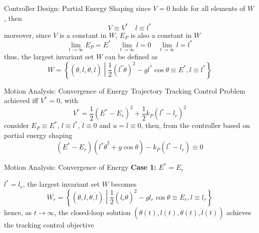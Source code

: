\documentclass[10pt]{beamer}
\begin{document}
  \begin{frame}{Controller Design: Partial Energy Shaping}
    since $\dot{V} = 0$ holds for all elements of $W$, then
    \begin{equation*}
      V \equiv V^* \quad l \equiv l^*
    \end{equation*} 
    moreover,
    since $V$ is a constant in $W$, $E_P$ is also a constant in $W$
    \begin{equation*}
      \lim_{t\rightarrow \infty} E_P = E^* \quad
      \lim_{t\rightarrow \infty} \dot{l} = 0 \quad
      \lim_{t\rightarrow \infty} l = l^*
    \end{equation*}     
    thus, the largest invariant set $W$ can be defined as
    \begin{equation*}
      W = \left\{(\theta,l,\dot{\theta},\dot{l})\middle|
        \frac{1}{2}(l^*\dot{\theta})^2-gl^*\cos\theta \equiv E^*,
        l \equiv l^*\right\}
    \end{equation*}
  \end{frame}

  \begin{frame}{Motion Analysis: Convergence of Energy}
    Trajectory Tracking Control Problem achieved iff $V^*=0$, with
    \begin{equation*}
      V^* = \frac{1}{2}(E^*-E_r)^2+\frac{1}{2}k_P(l^*-l_r)^2
    \end{equation*}
    consider $E_P \equiv E^*$, $l \equiv l^*$, $\dot{l} \equiv 0$
    and $u = \ddot{l} \equiv 0$, then, from the controller
    based on partial energy shaping
    \begin{equation*}
      (E^*-E_r)(l^*\dot{\theta}^2+g\cos\theta)-k_P(l^*-l_r) \equiv 0
    \end{equation*}
  \end{frame}

  \begin{frame}{Motion Analysis: Convergence of Energy}
    \noindent \textbf{Case 1:} $E^* = E_r$

    $l^* = l_r$, the largest invariant set $W$ becomes
    \begin{equation*}
      W_r = \left\{ (\theta, l, \dot{\theta}, \dot{l})
        \middle| \frac{1}{2} (l_r \dot{\theta})^2 -
        g l_r \cos\theta \equiv E_r, l \equiv l_r \right\}
    \end{equation*}
    hence, as $t \to \infty$, the closed-loop solution
    $(\theta(t), l(t), \dot{\theta}(t), \dot{l}(t))$ achieves the
    tracking control objective
  \end{frame}
\end{document}
